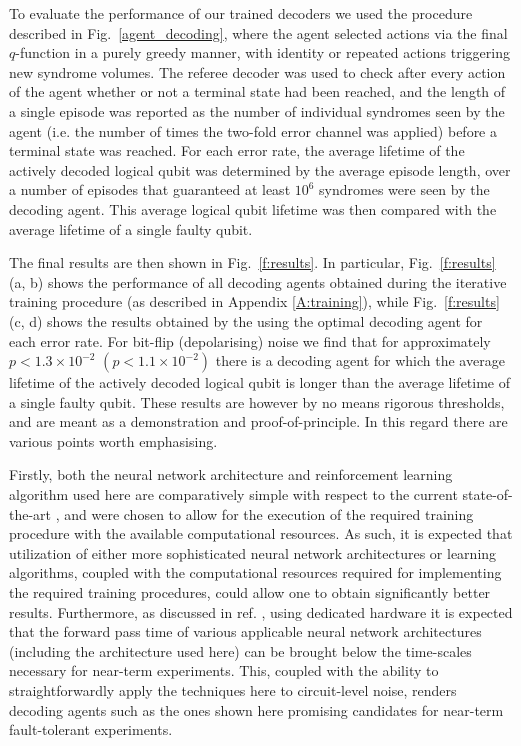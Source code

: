 \documentclass[twocolumn,preprintnumbers,amsmath,amssymb,notitlepage,nofootinbib,longbibliography,superscriptaddress,aps,pra,10pt]{revtex4-1}
\begin{document}
	To evaluate the performance of our trained decoders we used the procedure described in Fig.~\ref{agent_decoding}, where the agent selected actions via the final $q$-function in a purely greedy manner, with identity or repeated actions triggering new syndrome volumes.
	The referee decoder was used to check after every action of the agent whether or not a terminal state had been reached, and the length of a single episode was reported as the number of individual syndromes seen by the agent (i.e. the number of times the two-fold error channel was applied) before a terminal state was reached.
	For each error rate, the average lifetime of the actively decoded logical qubit was determined by the average episode length, over a number of episodes that guaranteed at least $10^6$ syndromes were seen by the decoding agent.
	This average logical qubit lifetime was then compared with the average lifetime of a single faulty qubit.

	The final results are then shown in Fig.\ \ref{f:results}.
	In particular, Fig.\ \ref{f:results} (a, b) shows the performance of all decoding agents obtained during the iterative training procedure (as described in Appendix \ref{A:training}), while Fig.\ \ref{f:results} (c, d) shows the results obtained by the using the optimal decoding agent for each error rate.
	For bit-flip (depolarising) noise we find that for approximately $p < 1.3\times 10^{-2}$  $(p < 1.1\times 10^{-2})$ there is a decoding agent for which the average lifetime of the actively decoded logical qubit is longer than the average lifetime of a single faulty qubit.
	These results are however by no means rigorous thresholds, and are meant as a demonstration and proof-of-principle. 
	In this regard there are various points worth emphasising.

	Firstly, both the neural network architecture and reinforcement learning algorithm used here are comparatively simple with respect to the current state-of-the-art \cite{RLmnih2016asynchronous,RLSilver17b,RLsilver2017mastering,RLSilver2016}, and were chosen to allow for the execution of the required training procedure with the available computational resources.
	As such, it is expected that utilization of either more sophisticated neural network architectures or learning algorithms, coupled with the computational resources required for implementing the required training procedures, could allow one to obtain significantly better results.
	Furthermore, as discussed in ref. \cite{chamberland2018deep}, using dedicated hardware it is expected that the forward pass time of various applicable neural network architectures (including the architecture used here) can be brought below the time-scales necessary for near-term experiments. 
	This, coupled with the ability to straightforwardly apply the techniques here to circuit-level noise, renders decoding agents such as the ones shown here promising candidates for near-term fault-tolerant experiments.
\end{document}

